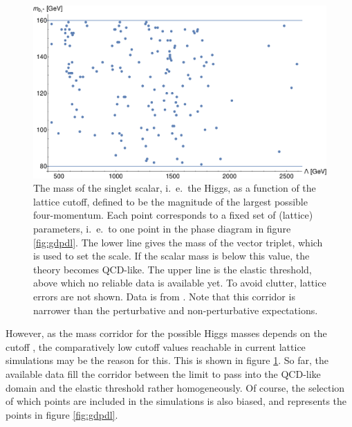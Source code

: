 \documentclass[final,12pt]{article}
\newcommand*{\1}{1\!\!\!\bot}
\begin{document}
\begin{figure}[hbtp!]
\begin{minipage}{0.6\linewidth}
\includegraphics[width=\linewidth]{hml}
\end{minipage}
\begin{minipage}{0.4\linewidth}
 \caption{\label{fig:hml}The mass of the singlet scalar, i.\ e.\ the Higgs, as a function of the lattice cutoff, defined to be the magnitude of the largest possible four-momentum. Each point corresponds to a fixed set of (lattice) parameters, i.\ e.\ to one point in the phase diagram in figure \ref{fig:gdpdl}. The lower line gives the mass of the vector triplet, which is used to set the scale. If the scalar mass is below this value, the theory becomes QCD-like. The upper line is the elastic threshold, above which no reliable data is available yet. To avoid clutter, lattice errors are not shown. Data is from \cite{Maas:unpublished,Maas:2014pba,Torek:2016ede}. Note that this corridor is narrower than the perturbative \cite{Altarelli:1994rb,Djouadi:2009nu} and non-perturbative \cite{Eichhorn:2015kea,Gies:2017ajd,Gies:2017zwf} expectations.}
\end{minipage}
\end{figure}

However, as the mass corridor for the possible Higgs masses depends on the cutoff \cite{Altarelli:1994rb,Callaway:1988ya,Bohm:2001yx,Djouadi:2009nu,Eichhorn:2015kea,Gies:2017ajd,Gies:2017zwf}, the comparatively low cutoff values reachable in current lattice simulations may be the reason for this. This is shown in figure \ref{fig:hml}. So far, the available data fill the corridor between the limit to pass into the QCD-like domain and the elastic threshold rather homogeneously. Of course, the selection of which points are included in the simulations is also biased, and represents the points in figure \ref{fig:gdpdl}.
\end{document}
